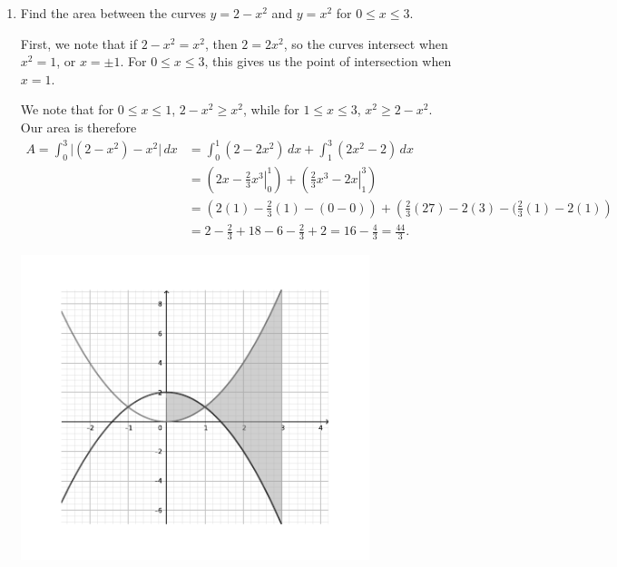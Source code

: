 \documentclass[12pt]{article}
\newcommand{\points}[1]{\marginpar{\hspace{24pt}[#1]}}
\newcommand{\abs}[1]{\lvert #1\rvert}
\begin{document}
\begin{enumerate}
\newpage

 \item Find the area between the curves $y= 2-x^2$ and $y=x^2$ for $0\leq x\leq 3$. \points{3}
 


First, we note that if $2-x^2=x^2$, then $2=2x^2$, so the curves intersect when $x^2=1$, or $x=\pm 1$. For $0\leq x\leq 3$, this gives us the point of intersection when $x=1$.

We note that for $0\leq x\leq 1$, $2-x^2\geq x^2$, while for $1\leq x\leq 3$, $x^2\geq 2-x^2$. Our area is therefore
\begin{align*}
A = \int_0^3\abs{(2-x^2)-x^2}\,dx &= \int_0^1 (2-2x^2)\,dx + \int_1^3 (2x^2-2)\,dx\\
&=\left(\left. 2x-\frac{2}{3}x^3\right|_0^1\right) +\left(\left.\frac{2}{3}x^3-2x\right|_1^3\right)\\
&=\left(2(1)-\frac{2}{3}(1)-(0-0)\right)+\left(\frac{2}{3}(27)-2(3)-(\frac{2}{3}(1)-2(1)\right)\\
&=2-\frac{2}{3}+18-6-\frac{2}{3}+2 = 16-\frac{4}{3} = \frac{44}{3}.
\end{align*}
\begin{center}
\includegraphics[width=4in]{TT6-fig2}
\end{center}

\end{enumerate}
\end{document}
